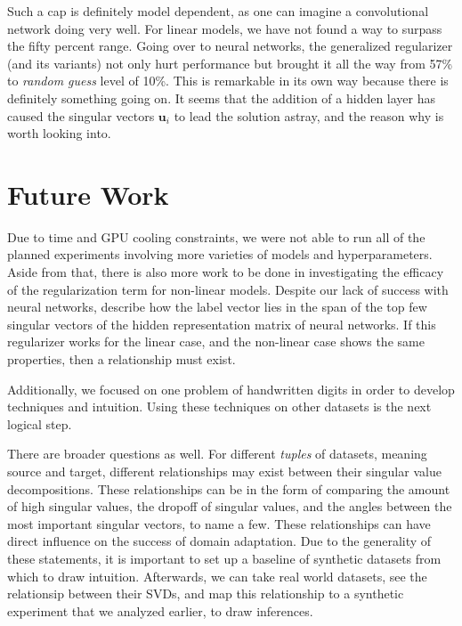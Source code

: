 \documentclass[twoside,11pt]{article}
\begin{document}
Such a cap is definitely model dependent, as one can imagine a convolutional network doing very well. For linear models, we have not found a way to surpass the fifty percent range. Going over to neural networks, the generalized regularizer (and its variants) not only hurt performance but brought it all the way from 57\% to \emph{random guess} level of 10\%. This is remarkable in its own way because there is definitely something going on. It seems that the addition of a hidden layer has caused the singular vectors $\mathbf{u}_i$ to lead the solution astray, and the reason why is worth looking into.

\section{Future Work}

Due to time and GPU cooling constraints, we were not able to run all of the planned experiments involving more varieties of models and hyperparameters. Aside from that, there is also more work to be done in investigating the efficacy of the regularization term for non-linear models. Despite our lack of success with neural networks, \cite{imani2022representation} describe how the label vector lies in the span of the top few singular vectors of the hidden representation matrix of neural networks. If this regularizer works for the linear case, and the non-linear case shows the same properties, then a relationship must exist. 

Additionally, we focused on one problem of handwritten digits in order to develop techniques and intuition. Using these techniques on other datasets is the next logical step. 

There are broader questions as well. For different \emph{tuples} of datasets, meaning source and target, different relationships may exist between their singular value decompositions. These relationships can be in the form of comparing the amount of high singular values, the dropoff of singular values, and the angles between the most important singular vectors, to name a few. These relationships can have direct influence on the success of domain adaptation. Due to the generality of these statements, it is important to set up a baseline of synthetic datasets from which to draw intuition. Afterwards, we can take real world datasets, see the relationsip between their SVDs, and map this relationship to a synthetic experiment that we analyzed earlier, to draw inferences. 

\end{document}
